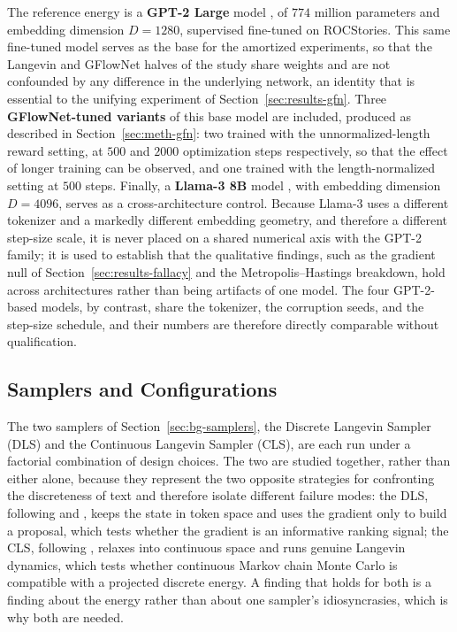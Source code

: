 The reference energy is a \textbf{GPT-2 Large} model \citep{radford2019language}, of $774$ million parameters and embedding dimension $D = 1280$, supervised fine-tuned on ROCStories. This same fine-tuned model serves as the base for the amortized experiments, so that the Langevin and GFlowNet halves of the study share weights and are not confounded by any difference in the underlying network, an identity that is essential to the unifying experiment of Section~\ref{sec:results-gfn}. Three \textbf{GFlowNet-tuned variants} of this base model are included, produced as described in Section~\ref{sec:meth-gfn}: two trained with the unnormalized-length reward setting, at $500$ and $2000$ optimization steps respectively, so that the effect of longer training can be observed, and one trained with the length-normalized setting at $500$ steps. Finally, a \textbf{Llama-3 8B} model \citep{dubey2024llama}, with embedding dimension $D = 4096$, serves as a cross-architecture control. Because Llama-3 uses a different tokenizer and a markedly different embedding geometry, and therefore a different step-size scale, it is never placed on a shared numerical axis with the GPT-2 family; it is used to establish that the qualitative findings, such as the gradient null of Section~\ref{sec:results-fallacy} and the Metropolis--Hastings breakdown, hold across architectures rather than being artifacts of one model. The four GPT-2-based models, by contrast, share the tokenizer, the corruption seeds, and the step-size schedule, and their numbers are therefore directly comparable without qualification.

\subsection{Samplers and Configurations}
\label{sec:meth-configs}

The two samplers of Section~\ref{sec:bg-samplers}, the Discrete Langevin Sampler (DLS) and the Continuous Langevin Sampler (CLS), are each run under a factorial combination of design choices. The two are studied together, rather than either alone, because they represent the two opposite strategies for confronting the discreteness of text and therefore isolate different failure modes: the DLS, following \citet{grathwohl2021oops} and \citet{zhang2022langevin}, keeps the state in token space and uses the gradient only to build a proposal, which tests whether the gradient is an informative ranking signal; the CLS, following \citet{kumar2022gradient}, relaxes into continuous space and runs genuine Langevin dynamics, which tests whether continuous Markov chain Monte Carlo is compatible with a projected discrete energy. A finding that holds for both is a finding about the energy rather than about one sampler's idiosyncrasies, which is why both are needed.

